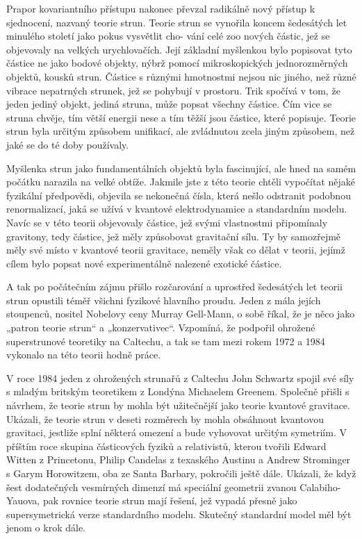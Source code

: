   Prapor kovariantního přístupu nakonec převzal radikálně nový přístup k sjednocení, nazvaný teorie
  strun. Teorie strun se vynořila koncem šedesátých let minulého století jako pokus vysvětlit cho-
  vání celé zoo nových částic, jež se objevovaly na velkých urychlovačích. Její základní myšlenkou
  bylo popisovat tyto částice ne jako bodové objekty, nýbrž pomocí mikroskopických jednorozměrných
  objektů, kousků strun. Částice s různými hmotnostmi nejsou nic jiného, než různé vibrace
  nepatrných strunek, jež se pohybují v prostoru. Trik spočívá v tom, že jeden jediný objekt, jediná
  struna, může popsat všechny částice. Čím vice se struna chvěje, tím větší energii nese a tím těžší
  jsou částice, které popisuje. Teorie strun byla určitým způsobem unifikací, ale zvládnutou zcela
  jiným způsobem, než jaké se do té doby používaly. 
  
  Myšlenka strun jako fundamentálních objektů byla fascinující, ale hned na samém počátku narazila
  na velké obtíže. Jakmile jste z této teorie chtěli vypočítat nějaké fyzikální předpovědi, objevila
  se nekonečná čísla, která nešlo odstranit podobnou renormalizací, jaká se užívá v kvantové
  elektrodynamice a standardním modelu. Navíc se v této teorii objevovaly částice, jež svými
  vlastnostmi připomínaly gravitony, tedy částice, jež měly způsobovat gravitační sílu. Ty by
  samozřejmě měly své místo v kvantové teorii gravitace, neměly však co dělat v teorii, jejímž cílem
  bylo popsat nové experimentálně nalezené exotické částice. 
  
  A tak po počátečním zájmu přišlo rozčarování a uprostřed šedesátých let teorii strun opustili
  téměř všichni fyzikové hlavního proudu. Jeden z mála jejích stoupenců, nositel Nobelovy ceny
  Murray Gell-Mann, o sobě říkal, že je něco jako „patron teorie strun“ a „konzervativec“. Vzpomíná,
  že podpořil ohrožené superstrunové teoretiky na Caltechu, a tak se tam mezi rokem 1972 a 1984
  vykonalo na této teorii hodně práce. 
  
  V roce 1984 jeden z ohrožených strunařů z Caltechu John Schwartz spojil své síly s mladým britským
  teoretikem z Londýna Michaelem Greenem. Společně přišli s návrhem, že teorie strun by mohla být
  užitečnější jako teorie kvantové gravitace. Ukázali, že teorie strun v deseti rozměrech by mohla
  obsáhnout kvantovou gravitaci, jestliže splní některá omezení a bude vyhovovat určitým symetriím.
  V příštím roce skupina částicových fyziků a relativistů, kterou tvořili Edward Witten z
  Princetonu, Philip Candelas z texaského Austinu a Andrew Strominger s Garym Horowitzem, oba ze
  Santa Barbary, pokročili ještě dále. Ukázali, že když šest dodatečných vesmírných dimenzí má
  speciální geometrii zvanou Calabiho-Yauova, pak rovnice teorie strun mají řešení, jež vypadá
  přesně jako supersymetrická verze standardního modelu. Skutečný standardní model měl být jenom o
  krok dále. 
  

